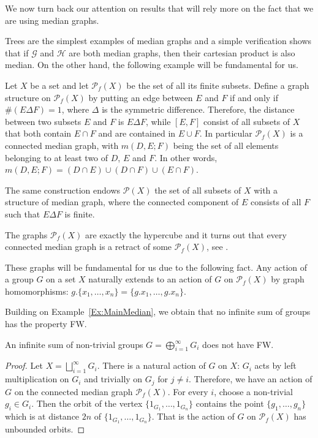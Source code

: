 \begin{lem}
We now turn back our attention on results that will rely more on the fact that we are using median graphs.

Trees are the simplest examples of median graphs and a simple verification shows that if $\mathcal G$ and $\mathcal H$ are both median graphs, then their cartesian product is also median.
On the other hand, the following example will be fundamental for us.
\begin{exmp}\label{Ex:MainMedian}
Let $X$ be a set and let  $\mathcal P_f(X)$ be the set of all its finite subsets.
Define a graph structure on $\mathcal P_f(X)$ by putting an edge between $E$ and $F$ if and only if $\#(E\Delta F)=1$, where $\Delta$ is the symmetric difference.
Therefore, the distance between two subsets $E$ and $F$ is $E\Delta F$, while $[E,F]$ consist of all subsets of $X$ that both contain $E\cap F$ and are contained in $E\cup F$.
In particular $\mathcal P_f(X)$ is a connected median graph, with $m(D,E;F)$ being the set of all elements belonging to at least two of $D$, $E$ and $F$. In other words,
$m(D,E;F)=(D\cap E)\cup(D\cap F)\cup(E\cap F)$.

The same construction endows $\mathcal P(X)$ the set of all subsets of $X$ with a structure of median graph, where the connected component of $E$ consists of all $F$ such that $E\Delta F$ is finite.
\end{exmp}

The graphs $\mathcal P_f(X)$ are exactly the hypercube and it turns out that every connected median graph is a retract of some $\mathcal P_f(X)$, see \cite{Bandelt1984}.

These graphs will be fundamental for us due to the following fact.
Any action of a group $G$ on a set $X$ naturally extends to an action of $G$ on $\mathcal P_f(X)$ by graph homomorphisms: $g.\{x_1,\dots,x_n\}=\{g.x_1,\dots,g.x_n\}$.

Building on Example~\ref{Ex:MainMedian}, we obtain that no infinite sum of groups has the property FW.
\begin{lem}\label{Lemma:Sum}
An infinite sum of non-trivial groups $G=\bigoplus_{i=1}^\infty G_i$ does not have FW.
\end{lem}
\begin{proof}
Let $X=\bigsqcup_{i=1}^\infty G_i$.
There is a natural action of $G$ on $X$: $G_i$ acts by left multiplication on $G_i$ and trivially on $G_j$ for $j\neq i$.
Therefore, we have an action of $G$ on the connected median graph $\mathcal P_f(X)$.
For every $i$, choose a non-trivial $g_i\in G_i$.
Then the orbit of the vertex $\{1_{G_1},\dots, 1_{G_n}\}$ contains the point $\{g_1,\dots, g_n\}$ which is at distance $2n$ of $\{1_{G_1},\dots, 1_{G_n}\}$.
That is the action of $G$ on $\mathcal P_f(X)$ has unbounded orbits.
\end{proof}


\end{lem}
